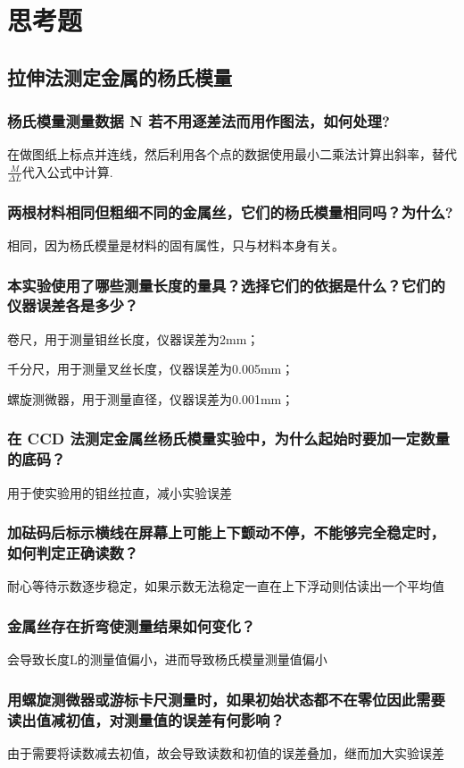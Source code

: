 \documentclass[12pt,a4paper]{article}
\begin{document}
\section{思考题}
\subsection{拉伸法测定金属的杨氏模量}

 

    \subsubsection{杨氏模量测量数据 N 若不用逐差法而用作图法，如何处理?}
    在做图纸上标点并连线，然后利用各个点的数据使用最小二乘法计算出斜率，替代$\frac{M}{\Delta L}$代入公式中计算.
    \subsubsection{两根材料相同但粗细不同的金属丝，它们的杨氏模量相同吗？为什么?}
    相同，因为杨氏模量是材料的固有属性，只与材料本身有关。
    \subsubsection{本实验使用了哪些测量长度的量具？选择它们的依据是什么？它们的仪器误差各是多少？}
    卷尺，用于测量钼丝长度，仪器误差为2mm；

    千分尺，用于测量叉丝长度，仪器误差为0.005mm；

    螺旋测微器，用于测量直径，仪器误差为0.001mm；
    \subsubsection{在 CCD 法测定金属丝杨氏模量实验中，为什么起始时要加一定数量的底码？}
    用于使实验用的钼丝拉直，减小实验误差
    \subsubsection{ 加砝码后标示横线在屏幕上可能上下颤动不停，不能够完全稳定时，如何判定正确读数？ }
    耐心等待示数逐步稳定，如果示数无法稳定一直在上下浮动则估读出一个平均值
    \subsubsection{金属丝存在折弯使测量结果如何变化？}
    会导致长度L的测量值偏小，进而导致杨氏模量测量值偏小
    \subsubsection{用螺旋测微器或游标卡尺测量时，如果初始状态都不在零位因此需要读出值减初值，对测量值的误差有何影响？}
    由于需要将读数减去初值，故会导致读数和初值的误差叠加，继而加大实验误差
\end{document}
